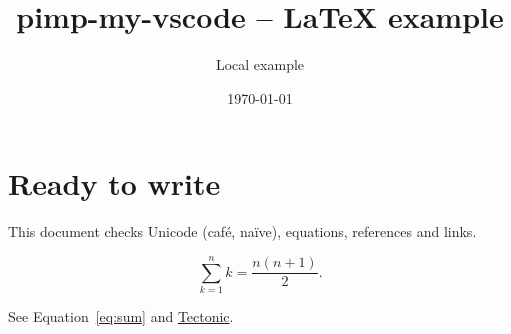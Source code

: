 \documentclass[11pt,a4paper]{article}
\title{pimp-my-vscode -- LaTeX example}
\author{Local example}
\date{\today}
\begin{document}
\maketitle
\section{Ready to write}
This document checks Unicode (café, naïve), equations, references and links.

\begin{equation}\label{eq:sum}
  \sum_{k=1}^{n} k = \frac{n(n+1)}{2}.
\end{equation}

See Equation~\eqref{eq:sum} and \href{https://tectonic-typesetting.github.io/}{Tectonic}.
\end{document}
